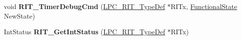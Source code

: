 \begin{DoxyCompactItemize}
\item 
\hypertarget{group___r_i_t___public___functions_ga23ea4004de807ff2fd111fd74de1ef6c}{void {\bfseries \-R\-I\-T\-\_\-\-Timer\-Debug\-Cmd} (\hyperlink{struct_l_p_c___r_i_t___type_def}{\-L\-P\-C\-\_\-\-R\-I\-T\-\_\-\-Type\-Def} $\ast$\-R\-I\-Tx, \hyperlink{group___l_p_c___types___public___types_gac9a7e9a35d2513ec15c3b537aaa4fba1}{\-Functional\-State} \-New\-State)}\label{group___r_i_t___public___functions_ga23ea4004de807ff2fd111fd74de1ef6c}

\item 
\hypertarget{group___r_i_t___public___functions_gaf9dcd68b83b865684d10af63c243ce89}{\-Int\-Status {\bfseries \-R\-I\-T\-\_\-\-Get\-Int\-Status} (\hyperlink{struct_l_p_c___r_i_t___type_def}{\-L\-P\-C\-\_\-\-R\-I\-T\-\_\-\-Type\-Def} $\ast$\-R\-I\-Tx)}\label{group___r_i_t___public___functions_gaf9dcd68b83b865684d10af63c243ce89}

\end{DoxyCompactItemize}
